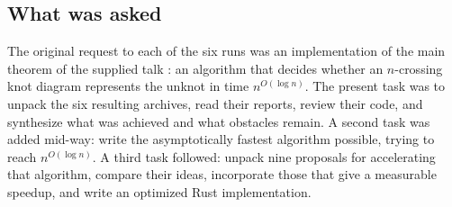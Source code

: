 \documentclass[11pt]{article}
\theoremstyle{remark}
\newcommand{\qp}{n^{O(\log n)}}
\begin{document}
\subsection{What was asked}
The original request to each of the six runs was an implementation of the
main theorem of the supplied talk \cite{slides}: an algorithm that decides
whether an $n$-crossing knot diagram represents the unknot in time $\qp$.
The present task was to unpack the six resulting archives, read their reports,
review their code, and synthesize what was achieved and what obstacles remain.
A second task was added mid-way: write the asymptotically fastest algorithm
possible, trying to reach $\qp$. A third task followed: unpack nine proposals
for accelerating that algorithm, compare their ideas, incorporate those that
give a measurable speedup, and write an optimized Rust implementation.
\end{document}
